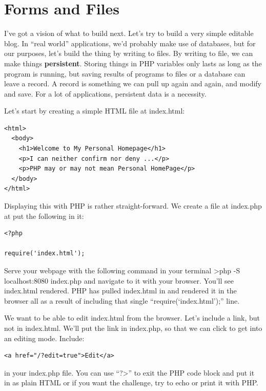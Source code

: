 \documentclass[
]{book}
\begin{document}
\hypertarget{Forms-and-Files}{%
\chapter{Forms and Files}\label{Forms-and-Files}}

I've got a vision of what to build next. Let's try to build a very simple editable blog. In ``real world'' applications, we'd probably make use of databases, but for our purposes, let's build the thing by writing to files. By writing to file, we can make things \textbf{persistent}. Storing things in PHP variables only lasts as long as the program is running, but saving results of programs to files or a database can leave a record. A record is something we can pull up again and again, and modify and save. For a lot of applications, persistent data is a necessity.

Let's start by creating a simple HTML file at index.html:

\begin{verbatim}
<html>
  <body>
    <h1>Welcome to My Personal Homepage</h1>
    <p>I can neither confirm nor deny ...</p>
    <p>PHP may or may not mean Personal HomePage</p>
  </body>
</html>
\end{verbatim}

Displaying this with PHP is rather straight-forward. We create a file at index.php at put the following in it:

\begin{verbatim}
<?php

require('index.html');
\end{verbatim}

Serve your webpage with the following command in your terminal \textgreater php -S localhost:8080 index.php and navigate to it with your browser. You'll see index.html rendered. PHP has pulled index.html in and rendered it in the browser all as a result of including that single ``require(`index.html');'' line.

We want to be able to edit index.html from the browser. Let's include a link, but not in index.html. We'll put the link in index.php, so that we can click to get into an editing mode. Include:

\begin{verbatim}
<a href="/?edit=true">Edit</a>
\end{verbatim}

in your index.php file. You can use ``?\textgreater{}'' to exit the PHP code block and put it in as plain HTML or if you want the challenge, try to echo or print it with PHP.
\end{document}
